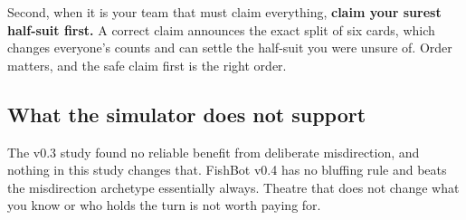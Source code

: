 Second, when it is your team that must claim everything, \textbf{claim your
surest half-suit first.} A correct claim announces the exact split of six cards,
which changes everyone's counts and can settle the half-suit you were unsure of.
Order matters, and the safe claim first is the right order.

\subsection{What the simulator does not support}

The v0.3 study found no reliable benefit from deliberate misdirection, and
nothing in this study changes that. FishBot v0.4 has no bluffing rule and beats
the misdirection archetype essentially always. Theatre that does not change what
you know or who holds the turn is not worth paying for.
